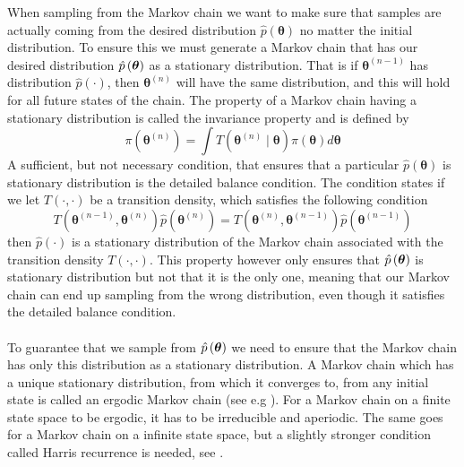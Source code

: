 When sampling from the Markov chain we want to make sure that samples are actually coming from the desired distribution $\hat{p}(\boldsymbol{\theta})$ no matter the initial distribution. To ensure this we must generate a Markov chain that has our desired distribution  $\hat{p}\left (\boldsymbol{\theta}\right)$ as a stationary distribution. That is if $\boldsymbol{\theta}^{(n-1)}$ has distribution $\hat{p}(\cdot)$, then  $\boldsymbol{\theta}^{(n)}$ will have the same distribution, and this will hold for all future states of the chain. The property of a Markov chain having a stationary distribution is called the invariance property and is defined by
\begin{equation*}
    \pi(\boldsymbol{\theta}^{(n)})=\int T(\boldsymbol{\theta}^{(n)}\mid \boldsymbol{\theta}) \pi(\boldsymbol{\theta})d\boldsymbol{\theta}
\end{equation*}
A sufficient, but not necessary condition, that ensures that a particular $\hat{p}(\boldsymbol{\theta})$ is stationary distribution is the detailed balance condition. The condition states if we let $T(\cdot,\cdot)$ be a transition density, which satisfies the following condition 
$$T(\boldsymbol{\theta}^{(n-1)}, \boldsymbol{\theta}^{(n)}) \hat{p}(\boldsymbol{\theta}^{(n)})= T(\boldsymbol{\theta}^{(n)}, \boldsymbol{\theta}^{(n-1)})\hat{p}(\boldsymbol{\theta}^{(n-1)})$$
then $\hat{p}(\cdot)$ is a stationary distribution of the Markov chain associated with the transition density $T(\cdot,\cdot)$. This property however only ensures that $\hat{p}\left (\boldsymbol{\theta}\right)$ is stationary distribution but not that it is the only one, meaning that our Markov chain can end up sampling from the wrong distribution, even though it satisfies the detailed balance condition.
\\
\\
To guarantee that we sample from $\hat{p} \left (\boldsymbol{\theta}\right)$ we need to ensure that the Markov chain has only this distribution as a stationary distribution. A Markov chain which has a unique stationary distribution, from which it converges to, from any initial state is called an ergodic Markov chain (see e.g \cite{turkman2019computational}). For a Markov chain on a finite state space to be ergodic, it has to be irreducible and aperiodic. The same goes for a Markov chain on a infinite state space, but a slightly stronger condition called Harris recurrence is needed, see \cite{gamerman2006markov}.                                   
\\
\\
